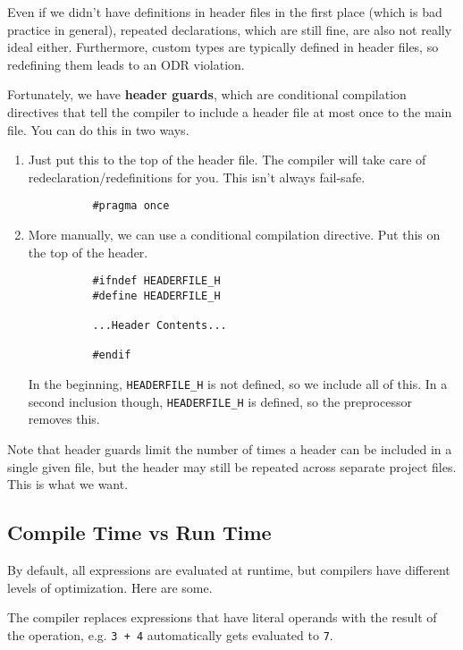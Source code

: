 \documentclass{article}
\begin{document}
    Even if we didn't have definitions in header files in the first place (which is bad practice in general), repeated declarations, which are still fine, are also not really ideal either. Furthermore, custom types are typically defined in header files, so redefining them leads to an ODR violation. 
    
    \begin{definition}
      Fortunately, we have \textbf{header guards}, which are conditional compilation directives that tell the compiler to include a header file at most once to the main file. You can do this in two ways. 
      \begin{enumerate}
        \item Just put this to the top of the header file. The compiler will take care of redeclaration/redefinitions for you. This isn't always fail-safe. 
        \begin{lstlisting}
          #pragma once
        \end{lstlisting} 

      \item More manually, we can use a conditional compilation directive. Put this on the top of the header. 
        \begin{lstlisting}
          #ifndef HEADERFILE_H
          #define HEADERFILE_H 
          
          ...Header Contents...

          #endif 
        \end{lstlisting}
        In the beginning, \texttt{HEADERFILE\_H} is not defined, so we include all of this. In a second inclusion though, \texttt{HEADERFILE\_H} is defined, so the preprocessor removes this. 
      \end{enumerate}

      Note that header guards limit the number of times a header can be included in a single given file, but the header may still be repeated across separate project files. This is what we want. 
    \end{definition}

  \subsection{Compile Time vs Run Time} 

    By default, all expressions are evaluated at runtime, but compilers have different levels of optimization. Here are some. 

    \begin{definition} 
      The compiler replaces expressions that have literal operands with the result of the operation, e.g. \texttt{3 + 4} automatically gets evaluated to \texttt{7}. 
    \end{definition}
\end{document}
